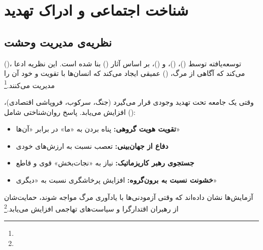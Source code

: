 \section{شناخت اجتماعی و ادراک تهدید}
\label{sec:ch11-threat-perception}

\subsection{نظریه‌ی مدیریت وحشت}
\label{subsec:ch11-tmt}

 ()، توسعه‌یافته توسط  ()،  ()، و  ()، بر اساس آثار  () بنا شده است. این نظریه ادعا می‌کند که آگاهی از مرگ،  () عمیقی ایجاد می‌کند که انسان‌ها با تقویت  و  خود آن را مدیریت می‌کنند.\footnote{}

\begin{tcolorbox}[defbox, title={مفهوم کلیدی: نظریه‌ی مدیریت وحشت و نجات‌طلبی}]
وقتی یک جامعه تحت تهدید وجودی قرار می‌گیرد (جنگ، سرکوب، فروپاشی اقتصادی)،  () افزایش می‌یابد. پاسخ روان‌شناختی شامل:
\begin{itemize}
\item \textbf{تقویت هویت گروهی:} پناه بردن به «ما» در برابر «آن‌ها»
\item \textbf{دفاع از جهان‌بینی:} تعصب نسبت به ارزش‌های خودی
\item \textbf{جستجوی رهبر کاریزماتیک:} نیاز به «نجات‌بخش» قوی و قاطع
\item \textbf{خشونت نسبت به برون‌گروه:} افزایش پرخاشگری نسبت به «دیگری»
\end{itemize}
آزمایش‌ها نشان داده‌اند که وقتی آزمودنی‌ها با یادآوری مرگ مواجه شوند، حمایت‌شان از رهبران اقتدارگرا و سیاست‌های تهاجمی افزایش می‌یابد.\footnote{}
\end{tcolorbox}

